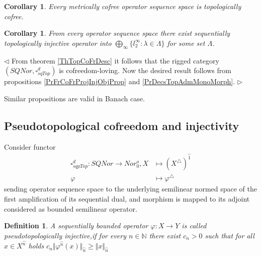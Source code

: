 \documentclass[12pt]{article}
\newtheorem{corollary}[theorem]{Corollary}
\newtheorem{definition}[theorem]{Definition}
\newenvironment{proof}{\par $\triangleleft$}{$\triangleright$}
\begin{document}
\begin{corollary}\label{PrMetrCoFrIsTopFr}
Every metrically cofree operator sequence space is topologically cofree.
\end{corollary}


\begin{corollary}\label{CorSQSpaceIsFromTopAdmMonoMorph}
From every operator sequence space there exist sequentially topologically injective operator into $\bigoplus_\infty\{l_2^\infty:\lambda\in\Lambda\}$  for some set $\Lambda$.
\end{corollary}
\begin{proof} From theorem \ref{ThTopCoFrDesc} it follows that the rigged category $(SQNor,\square_{sqTop}^d)$ is cofreedom-loving. Now the desired result follows from propositions \ref{PrFrCoFrProjInjObjProp} and \ref{PrDecsTopAdmMonoMorph}.
\end{proof} 

Similar propositions are valid in Banach case.





























\subsection{Pseudotopological cofreedom and injectivity}

Consider functor
$$
\begin{aligned}
\square_{sqpTop}^d : SQNor \rightarrow Nor_0^o, X &\mapsto (X^\triangle)^{\wideparen{1}}\\
\varphi&\mapsto\varphi^\triangle
\end{aligned}
$$
sending operator sequence space to the underlying semilinear normed space of the first amplification of its sequential dual, and morphism is mapped to its adjoint  considered as bounded semilinear operator.

\begin{definition}\label{DefPsSQTopInjOp} A sequentially bounded operator $\varphi:X\to Y$ is called pseudotopologically injective,if for every $n\in\mathbb{N}$ 
there exist $c_n>0$ such that for all $x\in X^{\wideparen{n}}$ holds $c_n\Vert\varphi^{\wideparen{n}}(x)\Vert_{\wideparen{n}}\geq \Vert x\Vert_{\wideparen{n}}$
\end{definition}
\end{document}
